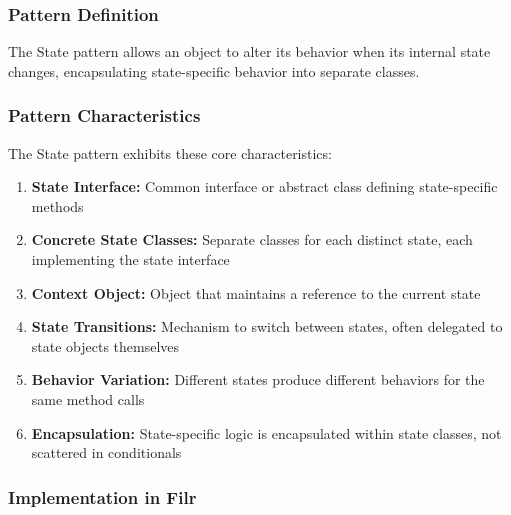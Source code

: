 \documentclass[11pt]{article}
\begin{document}
\subsubsection{Pattern Definition}
The State pattern allows an object to alter its behavior when its internal state changes, encapsulating state-specific behavior into separate classes.

\subsubsection{Pattern Characteristics}
The State pattern exhibits these core characteristics:

\begin{enumerate}[noitemsep]
    \item \textbf{State Interface:} Common interface or abstract class defining state-specific methods
    \item \textbf{Concrete State Classes:} Separate classes for each distinct state, each implementing the state interface
    \item \textbf{Context Object:} Object that maintains a reference to the current state
    \item \textbf{State Transitions:} Mechanism to switch between states, often delegated to state objects themselves
    \item \textbf{Behavior Variation:} Different states produce different behaviors for the same method calls
    \item \textbf{Encapsulation:} State-specific logic is encapsulated within state classes, not scattered in conditionals
\end{enumerate}

\subsubsection{Implementation in Filr}
\end{document}

